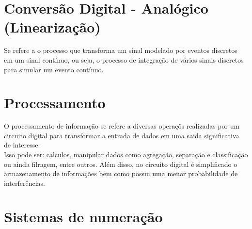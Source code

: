 \documentclass[12pt, onecolumn]{article}
\begin{document}
	\section{\centering Conversão Digital - Analógico (Linearização)}
	
	Se refere a o processo que transforma um sinal modelado por eventos 
	discretos em um sinal contínuo, ou seja, o processo de integração 
	de vários sinais discretos para simular um evento contínuo.

	\section{\centering Processamento}

	O processamento de informação se refere a diversas operaçõs 
	realizadas por um circuito digital para transformar a entrada 
	de dados em uma saida significativa de interesse.\\
	\newline
	Isso pode ser: calculos, manipular dados como agregação, 
	separação e classificação ou ainda filragem, entre outros. 
	Além disso, no circuito digital é simplificado o 
	armazenamento de informações bem como possui uma menor probabilidade 
	de interferências.
	
	\section{\centering Sistemas de numeração}
\end{document}
